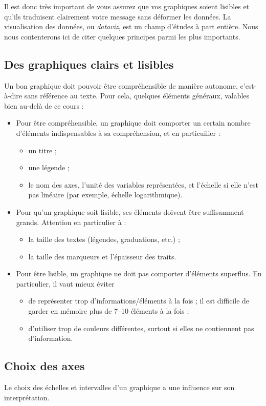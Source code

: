 Il est donc très important de vous assurez que vos graphiques soient lisibles
et qu'ils traduisent clairement votre message sans déformer les données. La
visualisation des données, ou \textit{dataviz}, est un champ d'études à part
entière.  Nous nous contenterons ici de citer quelques principes parmi les plus
importants.

\subsection{Des graphiques clairs et lisibles}
Un bon graphique doit pouvoir être compréhensible de manière autonome,
c'est-à-dire sans référence au texte. Pour cela, quelques éléments généraux,
valables bien au-delà de ce cours :
\begin{itemize}
\item Pour être compréhensible, un graphique doit comporter un certain nombre
  d'éléments indispensables à sa compréhension, et en particuilier :
  \begin{itemize}
  \item un titre ;
  \item une légende ;
  \item le nom des axes, l'unité des variables représentées, et l'échelle si
    elle n'est pas linéaire (par exemple, échelle logarithmique).
  \end{itemize}
\item Pour qu'un graphique soit lisible, ses éléments doivent être suffisamment
  grands. Attention en particulier à :
  \begin{itemize}
  \item la taille des textes (légendes, graduations, etc.) ;
  \item la taille des marqueurs et l'épaisseur des traits.
  \end{itemize}
\item Pour être lisible, un graphique ne doit pas comporter d'éléments
  superflus. En particulier, il vaut mieux éviter
  \begin{itemize}
  \item de représenter trop d'informations/éléments à la fois ;
    il est difficile de garder en mémoire plus de 7--10 éléments à la fois ;
  \item d'utiliser trop de couleurs différentes, surtout si elles ne
    contiennent pas d'information.
  \end{itemize}
\end{itemize}

\subsection{Choix des axes}
Le choix des échelles et intervalles d'un graphique a une influence sur son
interprétation.

